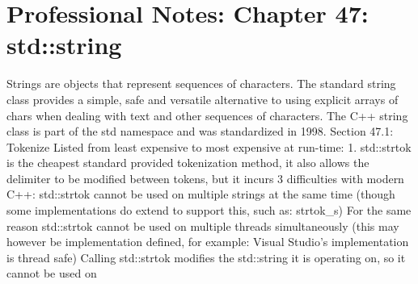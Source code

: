 \hypertarget{professional-notes-chapter-47-stdstring-1}{%
\chapter{Professional Notes: Chapter 47:
std::string}\label{professional-notes-chapter-47-stdstring-1}}

Strings are objects that represent sequences of characters. The standard
string class provides a simple, safe and versatile alternative to using
explicit arrays of chars when dealing with text and other sequences of
characters. The C++ string class is part of the std namespace and was
standardized in 1998. Section 47.1: Tokenize Listed from least expensive
to most expensive at run-time: 1. std::strtok is the cheapest standard
provided tokenization method, it also allows the delimiter to be modiﬁed
between tokens, but it incurs 3 diﬃculties with modern C++: std::strtok
cannot be used on multiple strings at the same time (though some
implementations do extend to support this, such as: strtok\_s) For the
same reason std::strtok cannot be used on multiple threads
simultaneously (this may however be implementation deﬁned, for example:
Visual Studio's implementation is thread safe) Calling std::strtok
modiﬁes the std::string it is operating on, so it cannot be used on
